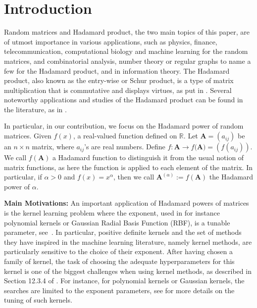 \documentclass[conference,letterpaper]{IEEEtran}
\numberwithin{equation}{section}
\begin{document}
%


\section{Introduction}
Random matrices and Hadamard product, the two main topics of this paper, are of utmost importance in various applications, such as physics, finance, telecommunication, computational biology and machine learning for the random matrices, and combinatorial analysis, number theory or regular graphs to name a few for the Hadamard product, and in information theory.
The Hadamard product, also known as the entry-wise or Schur product, is a type of matrix multiplication that is commutative and displays virtues, as put in \cite{horadam2012hadamard}. 
Several noteworthy applications and studies of the Hadamard product can be found in the literature, as in \cite{hedayat1978hadamard,agaian2006hadamard,bulutoglu2009counterexample,audenaert2010spectral}.

In particular, in our contribution, we focus on the Hadamard power of random matrices. 
Given $f(x)$, a real-valued function defined on $\mathbb{R}.$ Let $\mathbf{A}=(a_{ij})$ be an $n\times n$ matrix, where $a_{ij}$'s are real numbers.  Define $f: \mathbf{A} \rightarrow f(\mathbf{A)}=(f(a_{i j}))$. We call $f(\mathbf{A})$  a Hadamard function to distinguish it from the usual notion of matrix functions, as here the function is applied to each element of the matrix. 
In particular, if $\alpha>0$ and  $f(x)=x^{\alpha}$, then we call  $\mathbf{A}^{(\alpha)}:=f(\mathbf{A})$ the Hadamard power of $\alpha$. 

\textbf{Main Motivations: }
An important application of Hadamard powers of matrices is the kernel learning problem where the exponent, used in for instance polynomial kernels or Gaussian Radial Basis Function (RBF), is a tunable parameter, see~\cite{jiang2017hadamard, belton2019simultaneous}.
In particular, positive definite kernels and the set of methods they have inspired in the machine learning literature, namely kernel methods, are particularly sensitive to the choice of their exponent.
After having chosen a family of kernel, the task of choosing the adequate hyperparameters for this kernel is one of the biggest challenges when using kernel methods, as described in Section 12.3.4 of \cite{hastie2009elements}. 
For instance, for polynomial kernels or Gaussian kernels, the searches are limited to the exponent parameters, see \cite{bousquet2002complexity,frohlich2004feature,keerthi2007efficient} for more details on the tuning of such kernels.
\end{document}

